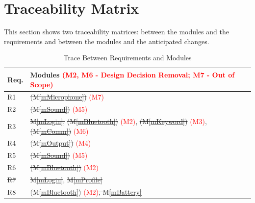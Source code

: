 \documentclass[12pt, titlepage]{article}
\newcommand{\mref}[1]{M\ref{#1}}
\begin{document}
\section{Traceability Matrix} \label{SecTM}

This section shows two traceability matrices: between the modules and the
requirements and between the modules and the anticipated changes.

\begin{table}[H]
\centering
\begin{tabular}{p{} p{}}
\toprule
\textbf{Req.} & \textbf{Modules \textcolor{red}{(M2, M6 - Design Decision Removal; M7 - Out of Scope)}}\\
\midrule

R1 & \sout{(\mref{mMicrophone})} \textcolor{red}{(M7)}\\
R2 & \sout{(\mref{mSound})} \textcolor{red}{(M5)}\\
R3 & \sout{\mref{mLogin},} \sout{(\mref{mBluetooth})} \textcolor{red}{(M2)}, \sout{(\mref{mKeyword})} \textcolor{red}{(M3)}, \sout{(\mref{mComm})} \textcolor{red}{(M6)} \\
R4 & \sout{(\mref{mOutput})} \textcolor{red}{(M4)}\\
R5 & \sout{(\mref{mSound})} \textcolor{red}{(M5)}\\
R6 & \sout{(\mref{mBluetooth})} \textcolor{red}{(M2)}\\
\sout{R7} &  \sout{\mref{mLogin}}, \sout{\mref{mProfile}}\\
R8 & \sout{(\mref{mBluetooth})} \textcolor{red}{(M2)}\sout{, \mref{mBattery}}\\
\bottomrule
\end{tabular}
\caption{Trace Between Requirements and Modules}
\label{TblRT}
\end{table}
\end{document}
